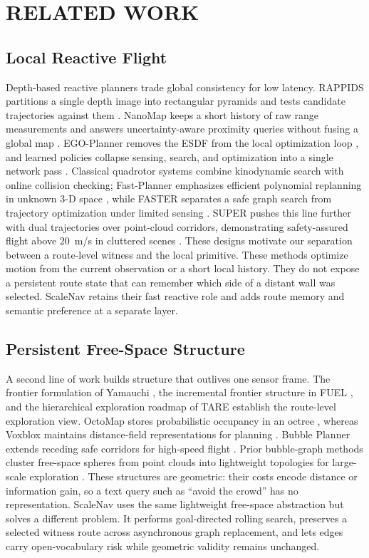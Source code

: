 \documentclass[letterpaper,10pt,conference]{ieeeconf}
\begin{document}
\section{RELATED WORK}
\subsection{Local Reactive Flight}
Depth-based reactive planners trade global consistency for low latency.
RAPPIDS partitions a single depth image into rectangular pyramids and tests
candidate trajectories against them \cite{rappids}.
NanoMap keeps a short history of raw range measurements and answers
uncertainty-aware proximity queries without fusing a global map
\cite{nanomap}.
EGO-Planner removes the ESDF from the local optimization loop
\cite{egoplanner}, and learned policies collapse sensing, search, and
optimization into a single network pass \cite{yopo,loquercio}.
Classical quadrotor systems combine kinodynamic search with online collision
checking; Fast-Planner emphasizes efficient polynomial replanning in unknown
3-D space \cite{fastplanner}, while FASTER separates a safe graph search from
trajectory optimization under limited sensing \cite{faster}.  SUPER pushes this
line further with dual trajectories over point-cloud corridors, demonstrating
safety-assured flight above $20$~m/s in cluttered scenes \cite{super}.
These designs motivate our separation between a route-level witness and the
local primitive.
These methods optimize motion from the current observation or a short local
history.  They do not expose a persistent route state that can remember which
side of a distant wall was selected.  ScaleNav retains their fast reactive role
and adds route memory and semantic preference at a separate layer.

\subsection{Persistent Free-Space Structure}
A second line of work builds structure that outlives one sensor frame.
The frontier formulation of Yamauchi \cite{yamauchi}, the incremental
frontier structure in FUEL \cite{fuel}, and the hierarchical exploration
roadmap of TARE \cite{tare} establish the route-level exploration
view.  OctoMap stores probabilistic occupancy in an octree \cite{octomap},
whereas Voxblox maintains distance-field representations for planning
\cite{voxblox}.
Bubble Planner extends receding safe corridors for
high-speed flight \cite{bubble}.
Prior bubble-graph methods cluster free-space spheres from point clouds into
lightweight topologies for large-scale exploration \cite{epic}.
These structures are geometric: their costs encode distance or information
gain, so a text query such as ``avoid the crowd'' has no representation.
ScaleNav uses the same lightweight free-space abstraction but solves a
different problem.
It performs goal-directed rolling search, preserves a selected witness
route across asynchronous graph replacement, and lets edges carry
open-vocabulary risk while geometric validity remains unchanged.
\end{document}
